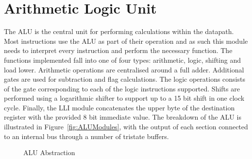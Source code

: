

\section{Arithmetic Logic Unit}\label{sect:design:alu}

The ALU is the central unit for performing calculations within the datapath. 
Most instructions use the ALU as part of their operation and as such this module needs to interpret every instruction and perform the necessary function. 
The functions implemented fall into one of four types: arithmetic, logic, shifting and load lower. 
Arithmetic operations are centralised around a full adder.
Additional gates are used for subtraction and flag calculations. %
The logic operations consists of the gate corresponding to each of the logic instructions supported. 
Shifts are performed using a logarithmic shifter to support up to a 15 bit shift in one clock cycle. 
Finally, the LLI module concatenates the upper byte of the destination register with the provided 8 bit immediate value. 
The breakdown of the ALU is illustrated in Figure~\ref{fig:ALUModules}, with the output of each section connected to an internal bus through a number of tristate buffers. 

\begin{figure}[h]
	\centering
	\caption{ALU Abstraction}
	\label{fig:ALUAbsract}
\end{figure}

